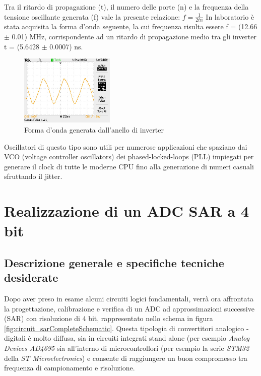 \documentclass[journal]{IEEEtran}
\begin{document}
Tra il ritardo di propagazione (t), il numero delle porte (n) e la frequenza della tensione oscillante generata (f) vale la presente relazione: 
\begin{math}
f = \frac{1}{2tn}
\end{math}
In laboratorio è stata acquisita la forma d'onda seguente, la cui frequenza risulta essere f = (12.66 $\pm$ 0.01) MHz, corrispondente ad un ritardo di propagazione medio tra gli inverter t = (5.6428 $\pm$ 0.0007) ns.
\begin{figure}[H]%
\begin{center}
\includegraphics[width=0.40\textwidth]{data-source/25-10-21/ring-oscillator.JPG}
\caption{Forma d'onda generata dall'anello di inverter}
\label{fig:graph_ring_oscillator}
\end{center}
\end{figure}
Oscillatori di questo tipo sono utili per numerose applicazioni che spaziano dai VCO (voltage controller oscillators) dei phased-locked-loops (PLL) impiegati per generare il clock di tutte le moderne CPU fino alla generazione di numeri casuali sfruttando il jitter.


\section{Realizzazione di un ADC SAR a 4 bit}

\subsection{Descrizione generale e specifiche tecniche desiderate}
Dopo aver preso in esame alcuni circuiti logici fondamentali, verrà ora affrontata la progettazione, calibrazione e verifica di un ADC ad approssimazioni successive (SAR) con risoluzione di 4 bit, rappresentato nello schema in figura \ref{fig:circuit_sarCompleteSchematic}. Questa tipologia di convertitori analogico - digitali è molto diffusa, sia in circuiti integrati stand alone (per esempio \textit{Analog Devices AD4695} sia all'interno di microcontrollori (per esempio la serie \textit{STM32} della \textit{ST Microelectronics}) e consente di raggiungere un buon compromesso tra frequenza di campionamento e risoluzione.
\end{document}

